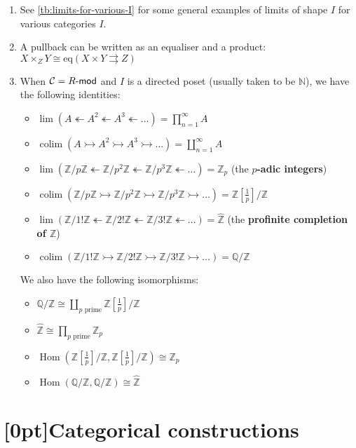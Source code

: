 \documentclass[10pt]{article}
\newcommand{\Rmod}{R\hbox{-}\mathsf{mod}}
\newcommand{\zz}{\mathbb{Z}}
\newcommand{\qq}{\mathbb{Q}}
\newcommand{\nn}{\mathbb{N}}
\newcommand{\ccat}{\mathcal{C}}
\newcommand{\mono}{\rightarrowtail}
\newcommand{\lepi}{\twoheadleftarrow}
\newcommand{\eq}{\mathrm{eq}}
\DeclareMathOperator{\Hom}{Hom}
\DeclareMathOperator*{\colim}{colim}
\newcommand{\CT}{\textcolor{orange}{CT}}
\begin{document}
                \begin{enumerate}
                    \item See \cref{tb:limits-for-various-I} for some general examples of limits of shape $I$ for various categories $I$.
                    \item A pullback can be written as an equaliser and a product: $X\times_Z Y\cong\eq(X\times Y\rightrightarrows Z)$
                    \item When $\ccat=\Rmod$ and $I$ is a directed poset (usually taken to be $\nn$), we have the following identities:
                        \begin{itemize}
                            \item $\lim(A\lepi A^2\lepi A^3\lepi\ldots)=\prod_{n=1}^\infty A$
                            \item $\colim(A\mono A^2\mono A^3\mono\ldots)=\coprod_{n=1}^\infty A$
                            \item $\lim(\zz/p\zz\lepi\zz/p^2\zz\lepi\zz/p^3\zz\lepi\ldots)=\zz_p$ (the \textbf{$p$-adic integers})
                            \item $\colim(\zz/p\zz\mono\zz/p^2\zz\mono\zz/p^3\zz\mono\ldots)=\zz[\frac{1}{p}]/\zz$
                            \item $\lim(\zz/1!\zz\lepi\zz/2!\zz\lepi\zz/3!\zz\lepi\ldots)=\widehat{\zz}$ (the \textbf{profinite completion of $\zz$})
                            \item $\colim(\zz/1!\zz\mono\zz/2!\zz\mono\zz/3!\zz\mono\ldots)=\qq/\zz$
                        \end{itemize}
                        We also have the following isomorphisms:
                        \begin{itemize}
                            \item $\qq/\zz\cong\coprod_{p\text{ prime}}\zz[\frac{1}{p}]/\zz$
                            \item $\widehat{\zz}\cong\prod_{p\text{ prime}}\zz_p$
                            \item $\Hom(\zz[\frac{1}{p}]/\zz,\zz[\frac{1}{p}]/\zz)\cong\zz_p$
                            \item $\Hom(\qq/\zz,\qq/\zz)\cong\widehat{\zz}$
                        \end{itemize}
                \end{enumerate}

    \section{\protect\marginnote{\CT}[0pt]Categorical constructions}
\end{document}
